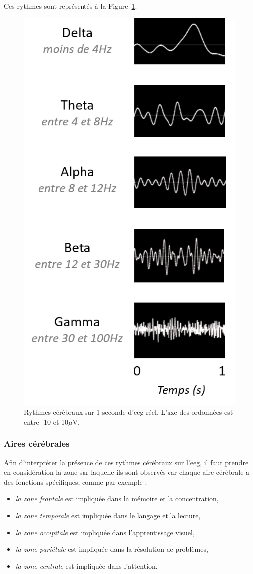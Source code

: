 Ces rythmes sont représentés à la Figure~\ref{Figure:introduction_EEG_waves}.

\begin{figure}[h!]
  \centering
	\includegraphics[width=0.5\linewidth]{figures/chapter-1/introduction-EEG-waves} 
  \caption[Rythmes cérébraux sur 1 seconde d'\gls{eeg} réel.]{Rythmes cérébraux sur 1 seconde d'\gls{eeg} réel. L'axe des ordonnées est entre -10 et 10$\mu$V.}
  \label{Figure:introduction_EEG_waves}
\end{figure}

\subsubsection{Aires cérébrales}

Afin d'interpréter la présence de ces rythmes cérébraux sur l'\gls{eeg}, il faut prendre en considération la zone sur laquelle ils sont observés 
car chaque aire cérébrale a des fonctions spécifiques, comme par exemple \citep{Marzbani2016} :
\begin{itemize}
\item \emph{la zone frontale} est impliquée dans la mémoire et la concentration,
\item \emph{la zone temporale} est impliquée dans le langage et la lecture,
\item \emph{la zone occipitale }est impliquée dans l'apprentissage visuel,
\item \emph{la zone pariétale} est impliquée dans la résolution de problèmes,
\item \emph{la zone centrale} est impliquée dans l'attention.
\end{itemize}

